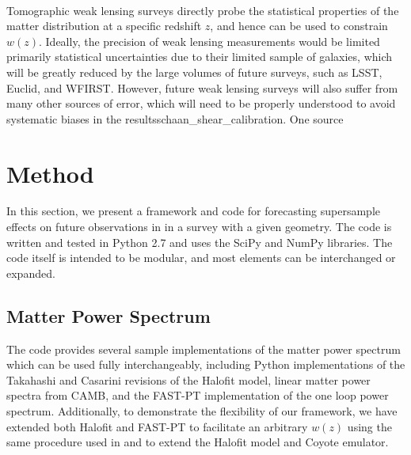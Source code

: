 \documentclass[a4paper,11pt]{article}
\begin{document}
\\
Tomographic weak lensing surveys directly probe the statistical properties of the matter distribution at a specific redshift $z$, and hence can be used to constrain $w(z)$\cite{weinberg_probes}\cite{huterer_wl}. Ideally, the precision of weak lensing measurements would be limited primarily statistical uncertainties due to their limited sample of galaxies, which will be greatly reduced by the large volumes of future surveys, such as LSST\cite{lsst}, Euclid\cite{euclid}, and WFIRST\cite{wfirst}. However, future weak lensing surveys will also suffer from many other sources of error, which will need to be properly understood to avoid systematic biases in the results{schaan_shear_calibration}\cite{systematic_lensing_mandelbaum}\cite{systematic_lensing_massey}\cite{systematic_lensing_huterer}. One source 

\section{Method}
\label{sec:method}
In this section, we present a framework and code for forecasting supersample effects on future observations in in a survey with a given geometry. The code is written and tested in Python 2.7 and uses the SciPy\cite{scipy} and NumPy\cite{numpy} libraries. The code itself is intended to be modular, and most elements can be interchanged or expanded. 
\subsection{Matter Power Spectrum}
\label{ssec:matter_power}
The code provides several sample implementations of the matter power spectrum which can be used fully interchangeably, including Python implementations of the Takahashi\cite{takahashi_halofit} and Casarini\cite{casarini_halofit} revisions of the Halofit\cite{smith_halofit} model, linear matter power spectra from CAMB\cite{camb}, and the FAST-PT\cite{fastpt} implementation of the one loop power spectrum. Additionally, to demonstrate the flexibility of our framework, we have extended both Halofit and FAST-PT to facilitate an arbitrary $w(z)$ using the same procedure used in \cite{casarini_halofit} and \cite{casarini_halofit_math} to extend the Halofit model and Coyote emulator\cite{coyote_emulator}. 
\end{document}
